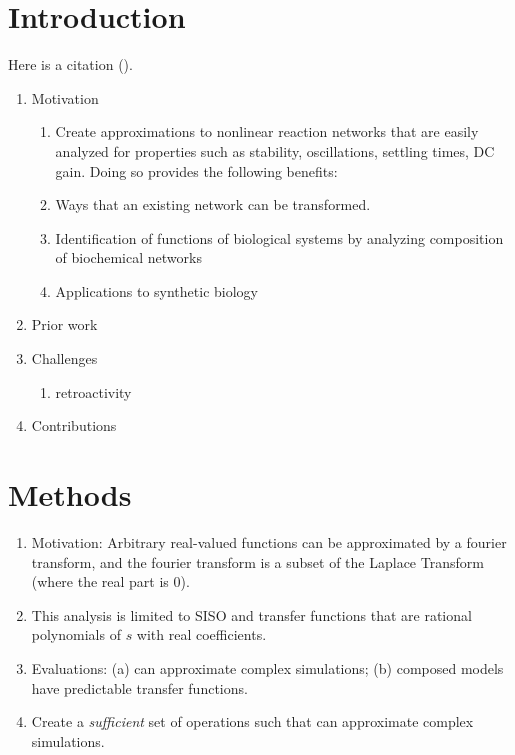 \documentclass[unnumsec,webpdf,contemporary,large]{oup-authoring-template}%
\theoremstyle{thmstyleone}%
\theoremstyle{thmstyletwo}%
\theoremstyle{thmstylethree}%
\begin{document}

\maketitle


\section{Introduction}
Here is a citation (\cite{al2002handgrip}).
\begin{enumerate}

\item
Motivation
\begin{enumerate}
\item Create approximations to nonlinear reaction networks
that are easily analyzed for properties such as stability, oscillations,
settling times, DC gain. Doing so provides the following benefits:
\item Ways that an existing network can be transformed.
\item Identification of functions of biological systems by analyzing
composition of biochemical networks
\item 
Applications to synthetic biology
\end{enumerate}

\item Prior work

\item Challenges
\begin{enumerate}
\item
retroactivity
\end{enumerate}

\item Contributions
\end{enumerate}



\section{Methods}\label{methods}
\begin{enumerate}
\item
Motivation: 
Arbitrary real-valued functions can be approximated by a fourier transform,
and the fourier transform is a subset of the Laplace Transform (where the real part is 0).
\item
This analysis is limited to SISO and transfer functions that
are rational polynomials of $s$ with real coefficients.
\item
Evaluations: (a) can approximate complex simulations; (b) composed models have predictable transfer functions.
\item
Create a {\em sufficient} set of operations such that can
approximate complex simulations.
\end{enumerate}
\end{document}
